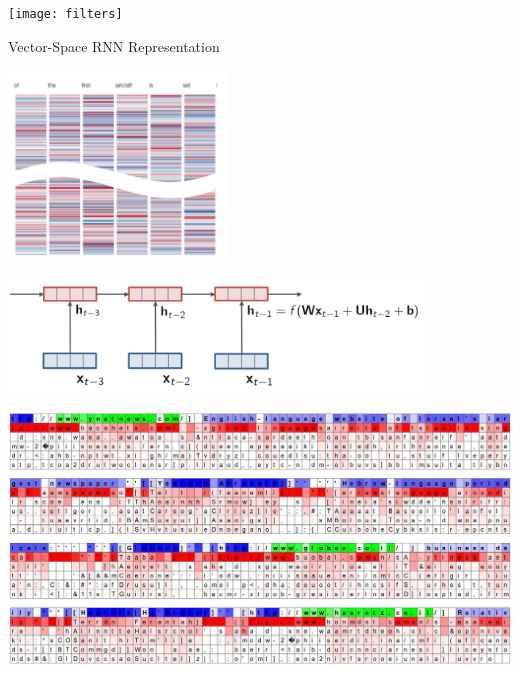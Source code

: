 \documentclass{beamer}
\newcommand{\air}{\vspace{0.25cm}}
\newcommand{\Cite}[1]{{\footnotesize \citep{#1}}}
\begin{document}
\begin{frame}
  \air 
  \texttt{[image: filters]}
  \begin{center}
     \Cite{DBLP:conf/eccv/ZeilerF14}
  \end{center}
\end{frame}


\begin{frame}
  \centerline{Vector-Space RNN Representation}
  \begin{center}
    \includegraphics[height=5cm]{lstmrep}
  \begin{center}
    \includegraphics[width=11cm]{rnn}
  \end{center}
  \end{center}
\end{frame}


\begin{frame}
  \begin{center}
    \includegraphics[width=\textwidth]{lstm1}

     \Cite{karpathy2015visualizing}
  \end{center}
\end{frame}
\end{document}
